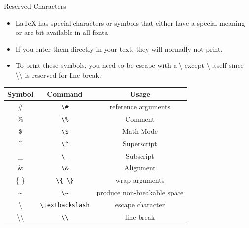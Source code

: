 \documentclass[style=lehigh,orient=landscape]{powerdot}
\begin{document}
\begin{wideslide}[bm={Reserved Characters},method=direct]{Reserved Characters}
  \begin{itemize}
  \item LaTeX has special characters or symbols that either have a special meaning or are bit available in all fonts.
  \item If you enter them directly in your text, they will normally not print.
  \item To print these symbols, you need to be escape with a \textbackslash{} except \textbackslash{} itself since \textbackslash\textbackslash{} is reserved for line break.
  \end{itemize}
  \begin{center}
    \begin{tabular}{|ccc|}
      \hline
      Symbol & Command & Usage\\
      \hline
      \# & \verb|\#| & reference arguments \\
      \% & \verb|\%| & Comment\\
      \$ & \verb|\$| & Math Mode\\
      \^{} & \verb|\^| & Superscript\\
      \_ & \verb|\_| & Subscript\\
      \& & \verb|\&| & Alignment\\
      \{ \} & \verb|\{ \}| & wrap arguments\\
      \~{} & \verb|\~| & produce non-breakable space \\
      \textbackslash & \verb|\textbackslash| & escape character\\
      \textbackslash\textbackslash & \verb|\\| & line break\\
      \hline
    \end{tabular}
  \end{center}
\end{wideslide}
\end{document}
